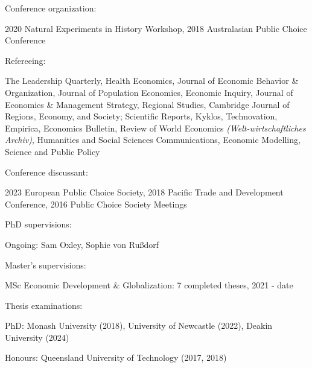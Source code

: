 \documentclass[letterpaper]{article}
\renewenvironment{itemize}{
  \begin{list}{}{
    \setlength{\leftmargin}{1.5em}
  }
}{
  \end{list}
}
\begin{document}
\begin{itemize}
	\item Conference organization:
	\begin{itemize}
		\item	2020 Natural Experiments in History Workshop, 2018 Australasian Public Choice Conference
	\end{itemize}
	

	
	\item Refereeing:
	\begin{itemize}
		
		\item The Leadership Quarterly, Health Economics, Journal of Economic Behavior \& Organization, Journal of Population Economics, Economic Inquiry, Journal of Economics \& Management Strategy, Regional Studies, Cambridge Journal of Regions, Economy, and Society; Scientific Reports, Kyklos, Technovation, Empirica, Economics Bulletin, Review of World Economics {\textit{(Welt-wirtschaftliches Archiv)}}, Humanities and Social Sciences Communications, Economic Modelling, Science and Public Policy	\end{itemize}
	
	\item Conference discussant:
	\begin{itemize}
		
		\item 2023 European Public Choice Society, 2018 Pacific Trade and Development Conference, 2016 Public Choice Society Meetings
	\end{itemize}
	
	\item PhD supervisions:
	\begin{itemize}
		\item Ongoing: Sam Oxley, Sophie von Rußdorf
	\end{itemize}
	
		\item Master's supervisions:
	\begin{itemize}
		\item MSc Economic Development \& Globalization: 7 completed theses, 2021 - date
	\end{itemize}
	
	\item Thesis examinations:
	\begin{itemize}
		\item PhD: Monash University (2018), University of Newcastle (2022), Deakin University (2024)
		\item Honours: Queensland University of Technology (2017, 2018)
	\end{itemize}
	
	
\end{itemize}
\end{document}
